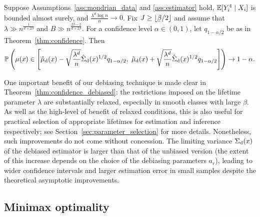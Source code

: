 \begin{theorem}%
  \label{thm:confidence_debiased}
  Suppose Assumptions~\ref{ass:mondrian_data} and \ref{ass:estimator} hold,
  $\mathbb{E}[Y_i^4 \mid X_i ]$ is bounded almost surely,
  and $\frac{\lambda^d \log n}{n} \to 0$.
  Fix $J \geq \lfloor \flbeta / 2 \rfloor$ and assume that
  $\lambda \gg n^{\frac{1}{d + 2 \beta}}$
  and $B \gg n^{\frac{2 \beta - 2}{d + 2 \beta}}$.
  For a confidence level $\alpha \in (0, 1)$,
  let $q_{1 - \alpha / 2}$ be as in Theorem~\ref{thm:confidence}. Then
  \begin{align*}
    \mathbb{P} \left(
      \mu(x) \in
      \left[
        \hat \mu_{\mathrm{d}}(x)
        - \sqrt{\frac{\lambda^d}{n}} \hat \Sigma_{\mathrm{d}}(x)^{1/2}
        q_{1 - \alpha / 2}, \
        \hat \mu_{\mathrm{d}}(x)
        + \sqrt{\frac{\lambda^d}{n}} \hat \Sigma_{\mathrm{d}}(x)^{1/2}
        q_{1 - \alpha / 2}
      \right]
    \right)
    \to
    1 - \alpha.
  \end{align*}

\end{theorem}

One important benefit of our debiasing technique is made clear in
Theorem~\ref{thm:confidence_debiased}: the restrictions imposed on the lifetime
parameter $\lambda$ are substantially relaxed, especially in smooth classes
with large $\beta$. As well as the high-level of benefit of relaxed conditions,
this is also useful for practical selection of appropriate lifetimes for
estimation and inference respectively; see
Section~\ref{sec:parameter_selection} for more details. Nonetheless, such
improvements do not come without concession. The limiting variance
$\Sigma_{\mathrm{d}}(x)$ of the debiased estimator is larger than that of the unbiased
version (the extent of this increase depends on the choice of the debiasing
parameters $a_r$), leading to wider confidence intervals and larger estimation
error in small samples despite the theoretical asymptotic improvements.

\subsection{Minimax optimality}

